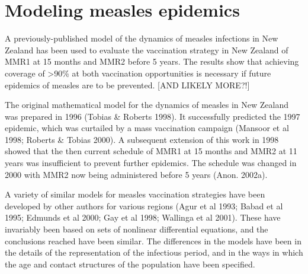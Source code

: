 \documentclass{article}
\begin{document}
\section{Modeling measles epidemics}

A previously-published model of the dynamics of measles infections
in New Zealand has been used to evaluate the vaccination strategy in New Zealand of
MMR1 at 15 months and MMR2 before 5 years. The results show that
achieving coverage of >90\% at both vaccination opportunities is
necessary if future epidemics of measles are to be prevented. [AND LIKELY MORE?!]

The original mathematical model for the dynamics of measles in New Zealand
was prepared in 1996 (Tobias & Roberts 1998). It successfully predicted the
1997 epidemic, which was curtailed by a mass vaccination campaign (Mansoor
et al 1998; Roberts & Tobias 2000). A subsequent extension of this work in
1998 showed that the then current schedule of MMR1 at 15 months and MMR2
at 11 years was insufficient to prevent further epidemics. The schedule was
changed in 2000 with MMR2 now being administered before 5 years (Anon.
2002a).

A variety of similar models for measles vaccination strategies have been developed
by other authors for various regions (Agur et al 1993; Babad et al 1995;
Edmunds et al 2000; Gay et al 1998; Wallinga et al 2001). These have invariably
been based on sets of nonlinear differential equations, and the conclusions
reached have been similar. The differences in the models have been in the details
of the representation of the infectious period, and in the ways in which
the age and contact structures of the population have been specified.
\end{document}
